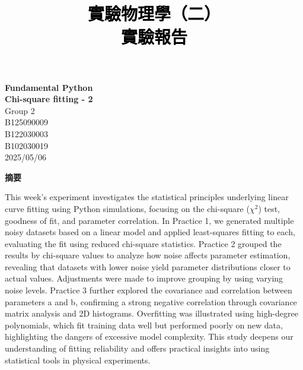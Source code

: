 \documentclass[12pt,a4paper]{article}
\title{\vspace{-0.5cm}
       {\bf \textcolor{black}{{\LARGE 
       \begin{CJK}{UTF8}{bkai}
       實驗物理學（二）\\
       \vspace{6pt}
        實驗報告\\
       \end{CJK}
       }}
       }
       }
\author{}
\date{}
\begin{document}
\begin{CJK}{UTF8}{bkai}

\maketitle
\thispagestyle{empty}

\vspace{10cm}
\begin{center}
{\bf \LARGE \vspace{-11cm} Fundamental Python\\
\vspace{0.25cm} Chi-square fitting - 2}\\
\vspace{13cm}
{\large Group 2}\\ \vspace{12pt}
{\large {} B125090009}\\ \vspace{6pt}
{\large {}  B122030003}\\ \vspace{6pt}
{\large {} B102030019}\\ \vspace{12pt}
{\large 2025/05/06}\\
\end{center}

\clearpage
\vspace{2cm}
\begin{center}
{\large\bf\sc 摘要}
\end{center}

\noindent

This week's experiment investigates the statistical principles underlying linear curve fitting using Python simulations, focusing on the chi-square ($\chi^2$) test, goodness of fit, and parameter correlation. In Practice 1, we generated multiple noisy datasets based on a linear model and applied least-squares fitting to each, evaluating the fit using reduced chi-square statistics. Practice 2 grouped the results by chi-square values to analyze how noise affects parameter estimation, revealing that datasets with lower noise yield parameter distributions closer to actual values. Adjustments were made to improve grouping by using varying noise levels. Practice 3 further explored the covariance and correlation between parameters a and b, confirming a strong negative correlation through covariance matrix analysis and 2D histograms. Overfitting was illustrated using high-degree polynomials, which fit training data well but performed poorly on new data, highlighting the dangers of excessive model complexity. This study deepens our understanding of fitting reliability and offers practical insights into using statistical tools in physical experiments.


\end{CJK}
\end{document}
